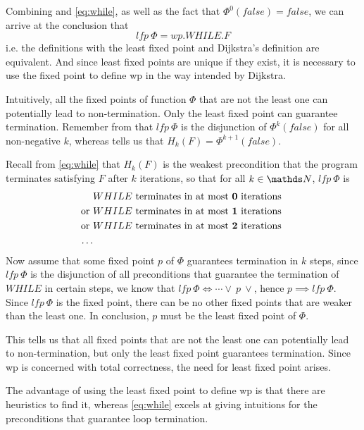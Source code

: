 Combining  and \autoref{eq:while}, as well as the fact that $\Phi^0(false)=false$, we can arrive at the conclusion that 
$$lfp\ \Phi = wp.WHILE.F$$
i.e. the definitions with the least fixed point and Dijkstra's definition are equivalent.
And since least fixed points are unique if they exist, it is necessary to use the  fixed point to define wp in the way intended by Dijkstra. 

Intuitively, all the fixed points of function $\Phi$ that are not the least one can potentially lead to non-termination. 
Only the least fixed point can guarantee termination. 
Remember from  that $lfp \ \Phi$ is the disjunction of $\Phi^{k}(false)$ for all non-negative $k$, whereas  tells us that $H_k(F)=\Phi^{k+1}(false)$.

Recall from \autoref{eq:while} that $H_k(F)$ is the weakest precondition that the program terminates satisfying $F$ after  $k$ iterations, so that for all $k\in\N$, $lfp\ \Phi$ is 
\begin{align*}
  & WHILE \text{ terminates in at most \textbf{0} iterations }\\
  \text{or } & WHILE \text{ terminates in at most \textbf{1} iterations} \\
  \text{or } & WHILE \text{ terminates in at most \textbf{2} iterations} \\
  \dots
\end{align*}
Now assume that some fixed point $p$ of $\Phi$ guarantees termination in $k$ steps, since $lfp\ \Phi$ is the disjunction of all preconditions that guarantee the termination of $WHILE$ in certain steps, we know that $lfp\ \Phi \Leftrightarrow \cdots\vee\ p\ \vee$, hence $p\implies lfp\ \Phi$. 
Since $lfp \ \Phi$ is the  fixed point, there can be no other fixed points that are weaker than the least one. 
In conclusion, $p$ must be the least fixed point of $\Phi$. 

This tells us that all fixed points that are not the least one can potentially lead to non-termination, but only the least fixed point guarantees termination. 
Since wp is concerned with total correctness, the need for least fixed point arises. 

The advantage of using the least fixed point to define wp is that there are heuristics to find it, whereas \autoref{eq:while} excels at giving intuitions for the preconditions that guarantee loop termination. 


